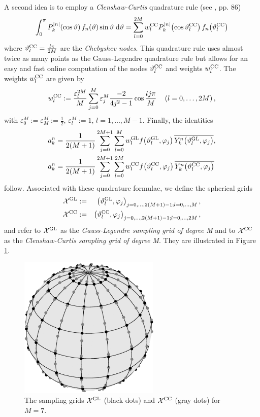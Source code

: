 A second idea is to employ a \emph{Clenshaw-Curtis} quadrature rule (see \cite{dara}, pp. 86)
\[
  \int_{0}^{\pi} P_{k}^{\left\vert n\right\vert}{\hspace{-0.4ex}}\left(\cos \vartheta\right) f_{n}{\hspace{-0.4ex}}\left(\vartheta\right) \sin \vartheta \; \text{\rm{d}} \vartheta = \sum_{l=0}^{2M} w_{l}^{\mbox{\scriptsize\rm{CC}}} P_{k}^{\left\vert n\right\vert}{\hspace{-0.4ex}}\left(\cos \vartheta_{l}^{\mbox{\scriptsize\rm{CC}}}\right) f_{n}{\hspace{-0.4ex}}\left(\vartheta_{l}^{\mbox{\scriptsize\rm{CC}}}\right)
\]
where $\vartheta_{l}^{\mbox{\scriptsize\rm{CC}}} = \frac{l\pi}{2M}$ are the \emph{Chebyshev nodes}.
This quadrature rule uses almost twice as many points as the Gauss-Legendre quadrature rule but allows for an easy and fast online computation of the nodes $\vartheta_{l}^{\mbox{\scriptsize\rm{CC}}}$ and weights $w_{l}^{\mbox{\scriptsize\rm{CC}}}$. The weights $ w_{l}^{\mbox{\scriptsize\rm{CC}}}$ 
are given by
\[ 
  w_{l}^{\mbox{\scriptsize\rm{CC}}} := \frac{\varepsilon_{l}^{2M}}{M} \sum_{j=0}^{M}
  \varepsilon_{j}^{M} \frac{-2}{4j^2-1} \cos\frac{lj\pi}{M} 
  \quad \left(l=0,\ldots,2M\right),
\]
with $\varepsilon_{0}^{M} := \varepsilon_{M}^{M} := \frac{1}{2}$, 
$\varepsilon_{l}^{M} := 1$, $l = 1,\ldots,M-1$.
Finally, the identities 
\begin{equation}
  \label{NFSFT:iDSFT}
  \begin{split}
    a_{k}^n & = \frac{1}{2(M+1)} \sum_{j=0}^{2M+1} \sum_{l=0}^{M} w_{l}^{\mbox{\scriptsize\rm{GL}}} f{\hspace{-0.4ex}}\left(\vartheta_{l}^{\mbox{\scriptsize\rm{GL}}},\varphi_{j}\right) \overline{Y_{k}^n{\hspace{-0.4ex}}\left(\vartheta_{l}^{\mbox{\scriptsize\rm{GL}}},\varphi_{j}\right)},\\
    a_{k}^n & = \frac{1}{2(M+1)} \sum_{j=0}^{2M+1} \sum_{l=0}^{2M} w_{l}^{\mbox{\scriptsize\rm{CC}}} f{\hspace{-0.4ex}}\left(\vartheta_{l}^{\mbox{\scriptsize\rm{CC}}},\varphi_{j}\right) 
  \overline{Y_{k}^n{\hspace{-0.4ex}}\left(\vartheta_{l}^{\mbox{\scriptsize\rm{CC}}},\varphi_{j}\right)}
  \end{split}
\end{equation}
follow. Associated with these quadrature formulae, we define the spherical grids
\begin{eqnarray*}
  \mathcal{X}^{\mbox{\scriptsize\rm{GL}}} & := & \left(\vartheta_{l}^{\mbox{\scriptsize\rm{GL}}},\varphi_{j}\right)_{j=0,\dots,2(M+1)-1;l=0,\dots,M},\\
  \mathcal{X}^{\mbox{\scriptsize\rm{CC}}} & := & \left(\vartheta_{l}^{\mbox{\scriptsize\rm{CC}}},\varphi_{j}\right)_{j=0,\dots,2(M+1)-1;l=0,\dots,2M},
\end{eqnarray*}
and refer to $\mathcal{X}^{\mbox{\scriptsize\rm{GL}}}$ as the \emph{Gauss-Legendre sampling grid of degree M} and to $\mathcal{X}^{\mbox{\scriptsize\rm{CC}}}$ as the 
\emph{Clenshaw-Curtis sampling grid of degree M}. They are illustrated in Figure \ref{quadrature}.
\begin{figure}[tb]
  \centering
  \includegraphics[width=0.6\textwidth]{images/quadrature}
  \caption{The sampling grids $\mathcal{X}^{\mbox{\scriptsize\rm{GL}}}$ (black dots) and $\mathcal{X}^{\mbox{\scriptsize\rm{CC}}}$ (gray dots) for $M=7$.}
  \label{quadrature}
\end{figure}
